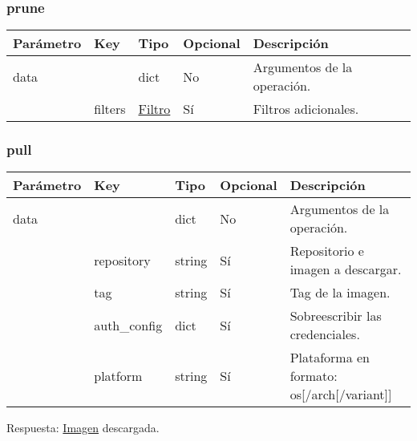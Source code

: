 			\subsubsection{prune}
				\begin{table}[h!]
					\centering
	\begin{adjustbox}{max width=\textwidth}
					\begin{tabular}{|l|l|l|l|l|}
						\hline
						Parámetro & Key & Tipo & Opcional & Descripción \\ \hline
						data &  & dict & No & Argumentos de la operación. \\ \hline
						& filters & \hyperref[sec:filtroimagen]{Filtro} & Sí & Filtros adicionales. \\ \hline
					\end{tabular}
\end{adjustbox}
				\end{table}
			
			\subsubsection{pull}
				\begin{table}[h!]
					\centering
	\begin{adjustbox}{max width=\textwidth}
					\begin{tabularx}{\linewidth}{|l|l|l|l|L|}
						\hline
						Parámetro & Key & Tipo & Opcional & Descripción \\ \hline
						data &  & dict & No & Argumentos de la operación. \\ \hline
						& repository & string & Sí & Repositorio e imagen a descargar. \\ \hline
						& tag & string & Sí & Tag de la imagen. \\ \hline
						& auth\_config & dict & Sí & Sobreescribir las credenciales. \\ \hline
						& platform & string & Sí & Plataforma en formato: os[/arch[/variant]] \\ \hline
					\end{tabularx}
\end{adjustbox}
				\end{table}
			
				Respuesta: \hyperref[sec:imagen]{Imagen} descargada.
				
